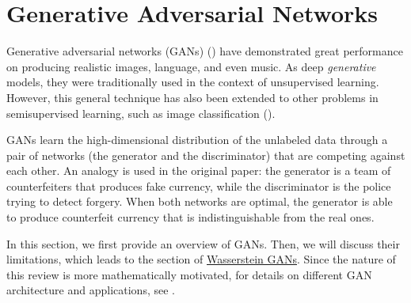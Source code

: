 \chapter{Generative Adversarial Networks}
\label{chp:GANs}
Generative adversarial networks (GANs) (\cite{NIPS2014_5ca3e9b1}) have demonstrated great performance on producing realistic images, language, and even music. As deep \textit{generative} models, they were traditionally used in the context of unsupervised learning. However, this general technique has also been extended to other problems in semisupervised learning, such as image classification (\cite{denton2015deep, radford2015unsupervised}).\par
GANs learn the high-dimensional distribution of the unlabeled data through a pair of networks (the generator and the discriminator) that are competing against each other. An analogy is used in the original paper: the generator is a team of counterfeiters that produces fake currency, while the discriminator is the police trying to detect forgery. When both networks are optimal, the generator is able to produce counterfeit currency that is indistinguishable from the real ones.\par
In this section, we first provide an overview of GANs. Then, we will discuss their limitations, which leads to the section of \hyperref[chp:WGANs]{Wasserstein GANs}. Since the nature of this review is more mathematically motivated, for details on different GAN architecture and applications, see \cite{creswell2018generative}.
